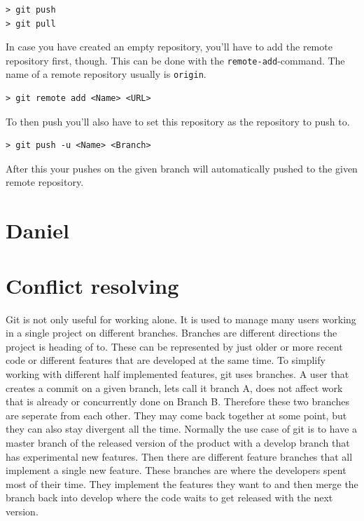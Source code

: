 \documentclass[a4paper, 12pt]{article}
\begin{document}
		\begin{lstlisting}
> git push
> git pull
		\end{lstlisting}
		
		In case you have created an empty repository, you'll have to add the remote repository first, though. This can be done with the \lstinline|remote-add|-command. The name of a remote repository usually is \lstinline|origin|.
		
		\begin{lstlisting}
> git remote add <Name> <URL>
		\end{lstlisting}
		
		To then push you'll also have to set this repository as the repository to push to.
		
		\begin{lstlisting}
> git push -u <Name> <Branch>
		\end{lstlisting}
		
		After this your pushes on the given branch will automatically pushed to the given remote repository.
		

	\section{Daniel}
			
	\section{Conflict resolving}
		
		Git is not only useful for working alone. It is used to manage many users working in a single project on different branches. Branches are different directions the project is heading of to. These can be represented by just older or more recent code or different features that are developed at the same time. To simplify working with different half implemented features, git uses branches. A user that creates a commit on a given branch, lets call it branch A, does not affect work that is already or concurrently done on Branch B. Therefore these two branches are seperate from each other. They may come back together at some point, but they can also stay divergent all the time. Normally the use case of git is to have a master branch of the released version of the product with a develop branch that has experimental new features. Then there are different feature branches that all implement a single new feature. These branches are where the developers spent most of their time. They implement the features they want to and then merge the branch back into develop where the code waits to get released with the next version.
		
\end{document}
